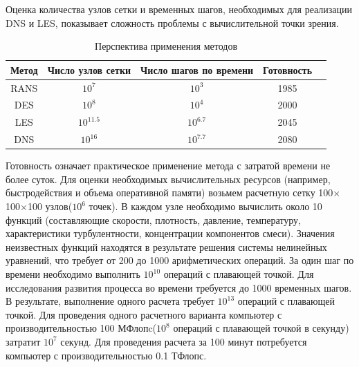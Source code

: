 	Оценка количества узлов сетки и временных шагов, необходимых для реализации DNS и LES, показывает сложность проблемы с вычислительной точки зрения.
	
	\begin{table}[H]
		\begin{center}
			\begin{tabular}{|c|c|c|c|c|}
				\hline
				Метод & Число узлов сетки & Число шагов по времени & Готовность\\
				\hline
				RANS & $10^7$ & $10^3$ & 1985\\
				\hline
				DES & $10^8$ & $10^4$ & 2000\\
				\hline
				LES & $10^{11.5}$ & $10^{6.7}$ & 2045\\
				\hline
				DNS & $10^{16}$ & $10^{7.7}$ & 2080\\
				\hline
			\end{tabular}
		\end{center}
		\caption{Перспектива применения методов}
	\end{table}
	Готовность означает практическое применение метода с затратой времени не более суток.
	Для оценки необходимых вычислительных ресурсов (например, быстродействия и объема оперативной памяти) возьмем расчетную сетку 100$\times$100$\times$100 узлов($10^6$ точек). В каждом узле необходимо вычислить около 10 функций (составляющие скорости, плотность, давление, температуру, характеристики турбулентности, концентрации компонентов смеси). Значения неизвестных функций находятся в результате решения системы нелинейных уравнений, что требует от 200 до 1000 арифметических операций. За один шаг по времени необходимо выполнить $10^{10}$ операций с плавающей точкой. Для исследования развития процесса во времени требуется до 1000 временных шагов. В результате, выполнение одного расчета требует $10^{13}$ операций с плавающей точкой. Для проведения одного расчетного варианта компьютер с производительностью 100 МФлопc($10^8$ операций с плавающей точкой в секунду) затратит $10^7$ секунд. Для проведения расчета за 100 минут потребуется компьютер с производительностью 0.1 ТФлопс.
